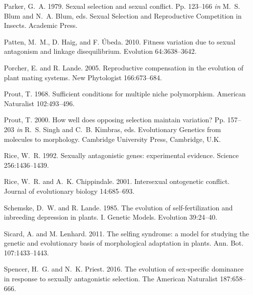 \documentclass{article}
\begin{document}
\begin{thebibliography}{}
Parker, G.~A. 1979.
\newblock Sexual selection and sexual conflict.
\newblock Pp. 123--166 \textit{in} M.~S. Blum and N.~A. Blum, eds. Sexual Selection and Reproductive Competition in Insects. Academic Press.

Patten, M.~M., D. Haig, and F. \'{U}beda. 2010.
\newblock Fitness variation due to sexual antagonism and linkage disequilibrium.
\newblock Evolution 64:3638--3642.

Porcher, E. and R. Lande. 2005.
\newblock Reproductive compensation in the evolution of plant mating systems.
\newblock New Phytologist 166:673--684.

Prout, T. 1968.
\newblock Sufficient conditions for multiple niche polymorphism.
\newblock American Naturalist 102:493--496.

Prout, T. 2000.
\newblock How well does opposing selection maintain variation?
\newblock Pp. 157--203 \textit{in} R.~S. Singh and C.~B. Kimbras, eds. Evolutionary Genetics from molecules to morphology. Cambridge University Press, Cambridge, U.K.

Rice, W.~R. 1992.
\newblock Sexually antagonistic genes: experimental evidence.
\newblock Science 256:1436--1439.

Rice, W.~R. and A.~K. Chippindale. 2001.
\newblock Intersexual ontogenetic conflict.
\newblock Journal of evolutionary biology 14:685--693.

Schemske, D.~W. and R. Lande. 1985.
\newblock The evolution of self-fertilization and inbreeding depression in plants. I. Genetic Models.
\newblock Evolution 39:24--40.

Sicard, A. and M. Lenhard. 2011.
\newblock The selfing syndrome: a model for studying the genetic and evolutionary basis of morphological adaptation in plants.
\newblock Ann. Bot. 107:1433--1443.

Spencer, H.~G. and N.~K. Priest. 2016.
\newblock The evolution of sex-specific dominance in response to sexually antagonistic selection.
\newblock The American Naturalist 187:658--666.


\end{thebibliography}
\end{document}
